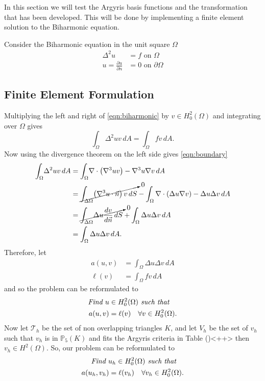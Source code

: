 In this section we will test the Argyris basis functions and the transformation
that has been developed. This will be done by implementing a finite element
solution to the Biharmonic equation.

Consider the Biharmonic equation in the unit square $\Omega$
\begin{subequations} \label{eqn:problem}
\begin{align}
	\Delta^2 u &= f \text{ on } \Omega \label{eqn:biharmonic}\\
	u= \frac{\partial u}{\partial n} &= 0 \text{ on } \partial \Omega
	\label{eqn:boundary}
\end{align}
\end{subequations}
\subsection{Finite Element Formulation}
Multiplying the left and right of \eqref{eqn:biharmonic} by $v\in
H^{2}_0(\Omega)$ and integrating over $\Omega$ gives
\begin{equation*}
	\int_{\Omega}\! \Delta^2 u v \,dA = \int_{\Omega}\! fv \,dA.
\end{equation*}
Now using the divergence theorem on the left side gives
\eqref{eqn:boundary}
\begin{align*}
	\int_{\Omega}\! \Delta^2 u v \,dA & = \int_{\Omega}\! \nabla \cdot
		\left( \nabla^3 u v \right) - \nabla^3 u \nabla v \,dA \\
  &= \cancelto{0}{\int_{\Delta\Omega}\! \left(\nabla^3 u \cdot \vec{n}\right) v \,dS} -
    \int_{\Omega} \nabla \cdot \left(\Delta u \nabla v\right) - \Delta u \Delta v \,dA \\
  &= \cancelto{0}{\int_{\Delta\Omega}\! \Delta u \frac{dv}{d\vec{n}} \,dS} +
    \int_{\Omega} \Delta u \Delta v \,dA \\
  &= \int_{\Omega} \Delta u \Delta v \,dA.
\end{align*}
Therefore, let 
\begin{align*}
	a(u,v) &= \int_{\Omega}\! \Delta u \Delta v \,dA \\
	\ell(v) &= \int_{\Omega}\! fv \,dA
\end{align*}
and so the problem can be reformulated to 
\begin{equation}
	\begin{split}
	\text{\emph{Find $u \in H^2_0(\Omega)$ such that}}\quad \\ 
	a(u,v) = \ell(v) \quad \forall v \in H^2_0(\Omega).
	\end{split}
\end{equation}
Now let $\mathcal{T}_h$ be the set of non overlapping triangles $K$, and let
$V_h$ be the set of $v_h$ such that $v_h$ is in $\mathbb{P}_5(K)$ and fits the
Argyris criteria in Table ()<++> then $v_h \in H^2(\Omega)$. So,
our problem can be reformulated to
\begin{equation}
	\begin{split}
	\text{\emph{Find $u_h \in H^2_0(\Omega)$ such that}}\quad \\ 
	a(u_h,v_h) = \ell(v_h) \quad \forall v_h \in H^2_0(\Omega).
	\end{split}
\end{equation}

